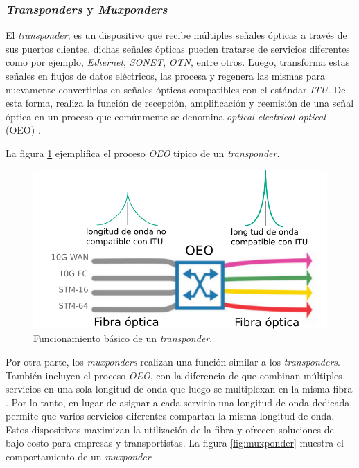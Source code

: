 \subsubsection{\textit{Transponders} y \textit{Muxponders}}
El \textit{transponder}, es un dispositivo que recibe múltiples señales ópticas a través de sus puertos clientes, dichas señales ópticas pueden tratarse de servicios diferentes como por ejemplo, \textit{Ethernet}, \textit{SONET}, \textit{OTN}, entre otros. Luego, transforma estas señales en flujos de datos eléctricos, las procesa y regenera las mismas para nuevamente convertirlas en señales ópticas compatibles con el estándar \textit{ITU}. De esta forma, realiza la función de recepción, amplificación y reemisión de una señal óptica en un proceso que comúnmente se denomina \textit{optical electrical optical} (OEO) \parencite{transpondermux}.


La figura \ref{fig:transponder} ejemplifica el proceso \textit{OEO} típico de un \textit{transponder}.

\begin{figure}[H]
	\centering
	\includegraphics[scale=0.8]{Figures/transponder.pdf}
	\caption{Funcionamiento básico de un \textit{transponder}.}
	\label{fig:transponder}
  \end{figure}

  Por otra parte, los \textit{muxponders} realizan una función similar a los \textit{transponders}. También incluyen el proceso \textit{OEO}, con la diferencia de que combinan múltiples servicios en una sola longitud de onda que luego se multiplexan en la misma fibra \parencite{transpondermux}. Por lo tanto, en lugar de asignar a cada servicio una longitud de onda dedicada, permite que varios servicios diferentes compartan la misma longitud de onda. Estos dispositivos maximizan la utilización de la fibra y ofrecen soluciones de bajo costo para empresas y transportistas. La figura \ref{fig:muxponder} muestra el comportamiento de un \textit{muxponder}.

